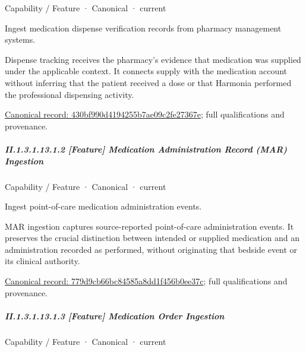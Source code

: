 \label{element:430bf990d4194255b7ae09c2fe27367e}
{\small Capability / Feature · Canonical · current}\par

Ingest medication dispense verification records from pharmacy management systems.



Dispense tracking receives the pharmacy's evidence that medication was supplied under the applicable context. It connects supply with the medication account without inferring that the patient received a dose or that Harmonia performed the professional dispensing activity.


{\footnotesize \href{../../../../../../../continuum/strategy/capability/feature/430bf990d4194255b7ae09c2fe27367e.md}{Canonical record: 430bf990d4194255b7ae09c2fe27367e}; full qualifications and provenance.}\par
\subparagraph*{II.1.3.1.13.1.2 [Feature] Medication Administration Record (MAR) Ingestion}
\label{navigation:II.1.3.1.13.1.2}

\label{element:779d9cb66bc84585a8dd1f456b0ee37c}
{\small Capability / Feature · Canonical · current}\par

Ingest point-of-care medication administration events.



MAR ingestion captures source-reported point-of-care administration events. It preserves the crucial distinction between intended or supplied medication and an administration recorded as performed, without originating that bedside event or its clinical authority.


{\footnotesize \href{../../../../../../../continuum/strategy/capability/feature/779d9cb66bc84585a8dd1f456b0ee37c.md}{Canonical record: 779d9cb66bc84585a8dd1f456b0ee37c}; full qualifications and provenance.}\par
\subparagraph*{II.1.3.1.13.1.3 [Feature] Medication Order Ingestion}
\label{navigation:II.1.3.1.13.1.3}

\label{element:5247b47f181243bb975ae2cd70db65ba}
{\small Capability / Feature · Canonical · current}\par

